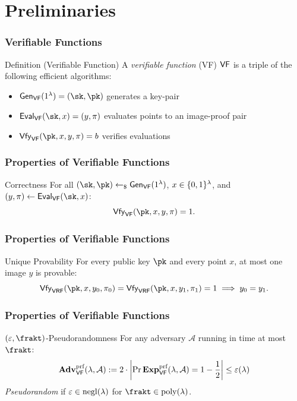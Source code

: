 \section{Preliminaries}

\begin{frame}
    \frametitle{Verifiable Functions}
    \begin{block}{Definition (Verifiable Function)}
        A \emph{verifiable function} (VF) $\textup{\textsf{VF}}$ is a triple of the following efficient algorithms:
        \begin{itemize}
            \item $\alg{Gen}{VF}(1^\lambda) = (\sk, \pk)$ generates a key-pair
            \item $\alg{Eval}{VF}(\sk, x) = (y, \pi)$ evaluates points to an image-proof pair
            \item $\alg{Vfy}{VF}(\pk, x, y, \pi) = b$ verifies evaluations
        \end{itemize}
    \end{block}
    \vspace{0.3em}
\end{frame}

\begin{frame}
    \frametitle{Properties of Verifiable Functions}
    \begin{block}{Correctness}
        For all $(\sk, \pk) \sample \alg{Gen}{VF}(1^\lambda)$, $x \in \{0,1\}^\lambda$, and $(y, \pi) \gets \alg{Eval}{VF}(\sk, x)$:
        \[
            \alg{Vfy}{VF}(\pk, x, y, \pi) = 1.
        \]
    \end{block}
\end{frame}

\begin{frame}
    \frametitle{Properties of Verifiable Functions}
    \begin{block}{Unique Provability}
        For every public key $\pk$ and every point $x$, at most one image $y$ is provable:
        \[
            \alg{Vfy}{VRF}(\pk, x, y_0, \pi_0) = \alg{Vfy}{VRF}(\pk, x, y_1, \pi_1) = 1
            \;\Longrightarrow\; y_0 = y_1.
        \]
    \end{block}
\end{frame}

\begin{frame}
    \frametitle{Properties of Verifiable Functions}
    \begin{block}{$(\varepsilon, \frakt)$-Pseudorandomness}
        For any adversary $\mathcal A$ running in time at most $\frakt$:
        \[
            \Adv{VF}{prf}{\lambda, \mathcal A} := 2 \cdot \abs*{\Pr{\Exp{VF}{prf}(\lambda, \mathcal A) = 1} - \frac{1}{2}} \le \varepsilon(\lambda)
        \]
        \emph{Pseudorandom} if $\varepsilon \in \operatorname{negl}(\lambda)$ for $\frakt \in \poly(\lambda)$.
    \end{block}
\end{frame}

